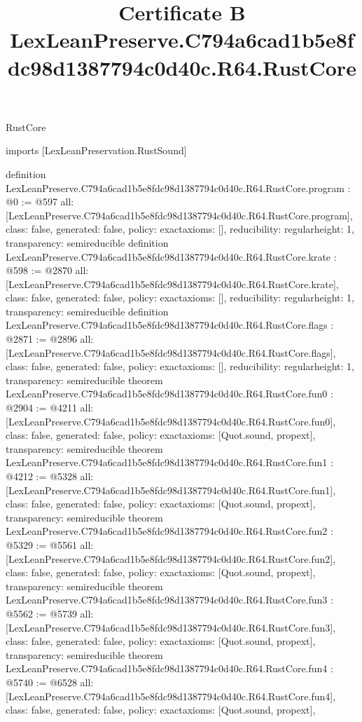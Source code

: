 \begin{lexlean}{RustCore}
\title{Certificate B LexLeanPreserve.C794a6cad1b5e8fdc98d1387794c0d40c.R64.RustCore}
\begin{coremodule}
imports [LexLeanPreservation.RustSound]

definition LexLeanPreserve.C794a6cad1b5e8fdc98d1387794c0d40c.R64.RustCore.program : @0 := @597 {
  all: [LexLeanPreserve.C794a6cad1b5e8fdc98d1387794c0d40c.R64.RustCore.program],
  class: false,
  generated: false,
  policy: exact{axioms: []},
  reducibility: regular{height: 1},
  transparency: semireducible
}
definition LexLeanPreserve.C794a6cad1b5e8fdc98d1387794c0d40c.R64.RustCore.krate : @598 := @2870 {
  all: [LexLeanPreserve.C794a6cad1b5e8fdc98d1387794c0d40c.R64.RustCore.krate],
  class: false,
  generated: false,
  policy: exact{axioms: []},
  reducibility: regular{height: 1},
  transparency: semireducible
}
definition LexLeanPreserve.C794a6cad1b5e8fdc98d1387794c0d40c.R64.RustCore.flags : @2871 := @2896 {
  all: [LexLeanPreserve.C794a6cad1b5e8fdc98d1387794c0d40c.R64.RustCore.flags],
  class: false,
  generated: false,
  policy: exact{axioms: []},
  reducibility: regular{height: 1},
  transparency: semireducible
}
theorem LexLeanPreserve.C794a6cad1b5e8fdc98d1387794c0d40c.R64.RustCore.fun0 : @2904 := @4211 {
  all: [LexLeanPreserve.C794a6cad1b5e8fdc98d1387794c0d40c.R64.RustCore.fun0],
  class: false,
  generated: false,
  policy: exact{axioms: [Quot.sound, propext]},
  transparency: semireducible
}
theorem LexLeanPreserve.C794a6cad1b5e8fdc98d1387794c0d40c.R64.RustCore.fun1 : @4212 := @5328 {
  all: [LexLeanPreserve.C794a6cad1b5e8fdc98d1387794c0d40c.R64.RustCore.fun1],
  class: false,
  generated: false,
  policy: exact{axioms: [Quot.sound, propext]},
  transparency: semireducible
}
theorem LexLeanPreserve.C794a6cad1b5e8fdc98d1387794c0d40c.R64.RustCore.fun2 : @5329 := @5561 {
  all: [LexLeanPreserve.C794a6cad1b5e8fdc98d1387794c0d40c.R64.RustCore.fun2],
  class: false,
  generated: false,
  policy: exact{axioms: [Quot.sound, propext]},
  transparency: semireducible
}
theorem LexLeanPreserve.C794a6cad1b5e8fdc98d1387794c0d40c.R64.RustCore.fun3 : @5562 := @5739 {
  all: [LexLeanPreserve.C794a6cad1b5e8fdc98d1387794c0d40c.R64.RustCore.fun3],
  class: false,
  generated: false,
  policy: exact{axioms: [Quot.sound, propext]},
  transparency: semireducible
}
theorem LexLeanPreserve.C794a6cad1b5e8fdc98d1387794c0d40c.R64.RustCore.fun4 : @5740 := @6528 {
  all: [LexLeanPreserve.C794a6cad1b5e8fdc98d1387794c0d40c.R64.RustCore.fun4],
  class: false,
  generated: false,
  policy: exact{axioms: [Quot.sound, propext]},
}
\end{coremodule}
\end{lexlean}
